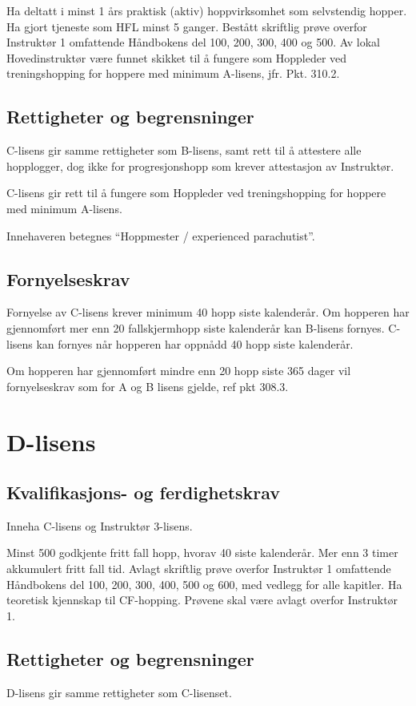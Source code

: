 Ha deltatt i minst 1 års praktisk (aktiv) hoppvirksomhet som selvstendig hopper. Ha gjort tjeneste som HFL minst 5 ganger. Bestått skriftlig prøve overfor Instruktør 1 omfattende Håndbokens del 100, 200, 300, 400 og 500. Av lokal Hovedinstruktør være funnet skikket til å fungere som Hoppleder ved treningshopping for hoppere med minimum A-lisens, jfr. Pkt. 310.2.

\subsection{Rettigheter og begrensninger}
C-lisens gir samme rettigheter som B-lisens, samt rett til å attestere alle hopplogger, dog ikke for progresjonshopp som krever attestasjon av Instruktør.

C-lisens gir rett til å fungere som Hoppleder ved treningshopping for hoppere med minimum A-lisens.

Innehaveren betegnes ``Hoppmester / experienced parachutist''.

\subsection{Fornyelseskrav}
Fornyelse av C-lisens krever minimum 40 hopp siste kalenderår. Om hopperen har gjennomført mer enn 20 fallskjermhopp siste kalenderår kan B-lisens fornyes. C-lisens kan fornyes når hopperen har oppnådd 40 hopp siste kalenderår.

Om hopperen har gjennomført mindre enn 20 hopp siste 365 dager vil fornyelseskrav som for A og B lisens gjelde, ref pkt 308.3.

\section{D-lisens}
\subsection{Kvalifikasjons- og ferdighetskrav}
Inneha C-lisens og Instruktør 3-lisens.

Minst 500 godkjente fritt fall hopp, hvorav 40 siste kalenderår. Mer enn 3 timer akkumulert fritt fall tid. Avlagt skriftlig prøve overfor Instruktør 1 omfattende Håndbokens del 100, 200, 300, 400, 500 og 600, med vedlegg for alle kapitler. Ha teoretisk kjennskap til CF-hopping. Prøvene skal være avlagt overfor Instruktør 1.

\subsection{Rettigheter og begrensninger}
D-lisens gir samme rettigheter som C-lisenset.

